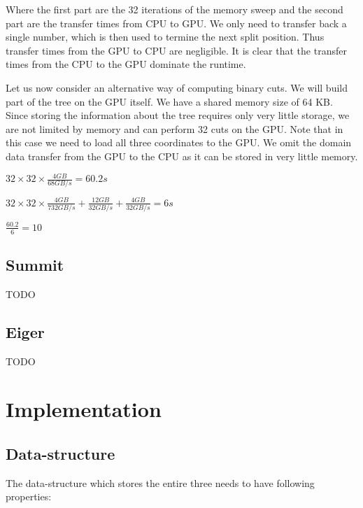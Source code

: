 \documentclass[]{article}
\begin{document}
Where the first part are the 32 iterations of the memory sweep and the second part are the transfer times from CPU to GPU. We only need to transfer back a single number, which is then used to termine the next split position. Thus transfer times from the GPU to CPU are negligible. It is clear that the transfer times from the CPU to the GPU dominate the runtime.

Let us now consider an alternative way of computing binary cuts. We will build part of the tree on the GPU itself. We have a shared memory size of 64 KB. Since storing the information about the tree requires only very little storage, we are not limited by memory and can perform 32 cuts on the GPU. Note that in this case we need to load all three coordinates to the GPU. We omit the domain data transfer from the GPU to the CPU as it can be stored in very little memory. 

\begin{center}
	$32 \times 32 \times \frac{ 4 GB}{68 GB/s} = 60.2 s$ 
\end{center}

\begin{center}
	$32 \times 32 \times \frac{4 GB}{732 GB/s} + \frac{12 GB}{32 GB/s} + \frac{4 GB}{32 GB/s} = 6 s$ 
\end{center}

\begin{center}
	$\frac{60.2}{6} = 10$ 
\end{center}

\subsection{Summit}

TODO

\subsection{Eiger}

TODO 

\section{Implementation}

\subsection{Data-structure}

The data-structure which stores the entire three needs to have following properties:
\end{document}
